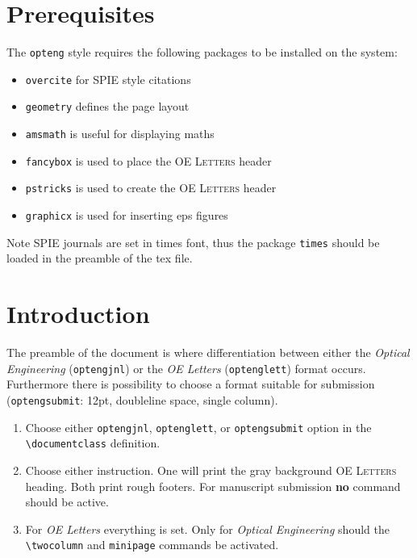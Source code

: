 \documentclass[10pt,letterpaper,optenglett,fleqn]{article}      %
\begin{document}
\section{Prerequisites}

The \texttt{opteng} style requires the following packages to be
installed on the system:

\begin{itemize}

\item \texttt{overcite} for SPIE style citations

\item \texttt{geometry} defines the page layout

\item \texttt{amsmath} is useful for displaying maths

\item \texttt{fancybox} is used to place the \textsc{OE Letters}
header

\item \texttt{pstricks} is used to create the \textsc{OE Letters}
header

\item \texttt{graphicx} is used for inserting eps figures

\end{itemize}

Note SPIE journals are set in times font, thus the package
\texttt{times} should be loaded in the preamble of the tex file.


\section{Introduction}

The preamble of the document is where differentiation between either
the \emph{Optical Engineering} (\texttt{optengjnl}) or the \emph{OE
Letters} (\texttt{optenglett}) format occurs. Furthermore there is
possibility to choose a format suitable for submission
(\texttt{optengsubmit}: 12pt, doubleline space, single column).

\begin{enumerate}

\item Choose either \texttt{optengjnl}, \texttt{optenglett}, or \texttt{optengsubmit} option in the
\verb+\documentclass+ definition.

\item Choose either \texttt{\fancyput} instruction. One will print the
gray background \textsc{OE Letters} heading. Both print rough
footers. For manuscript submission \textbf{no} \texttt{\fancyput}
command should be active.

\item For \emph{OE Letters} everything is set. Only for
\emph{Optical Engineering} should the \verb+\twocolumn+ and
\texttt{minipage} commands be activated.

\end{enumerate}
\end{document}
